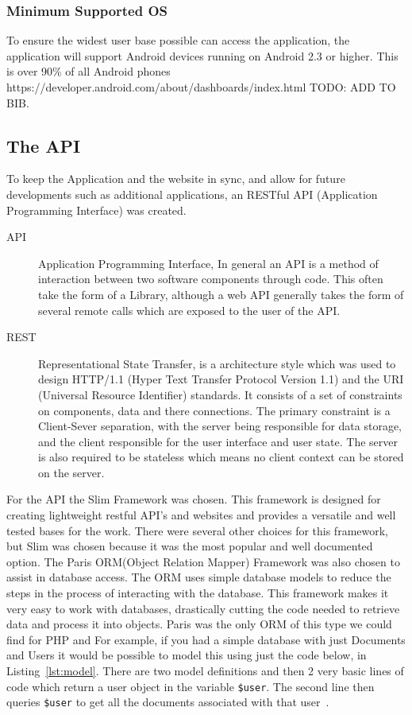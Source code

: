 \documentclass[11pt,a4paper]{article}
\begin{document}
\subsubsection{Minimum Supported OS}
To ensure the widest user base possible can access the application, the application will support Android devices running on Android 2.3 or higher. This is over 90\% of all Android phones https://developer.android.com/about/dashboards/index.html TODO: ADD TO BIB.

\subsection{The API}
\label{sec:techAPI}
To keep the Application and the website in sync, and allow for future developments such as additional applications, an RESTful API (Application Programming Interface) was created.

\begin{description}
\item[API] Application Programming Interface, In general an API is a method of interaction between two software components through code. This often take the form of a Library, although a web API generally takes the form of several remote calls which are exposed to the user of the API.

\item[REST] Representational State Transfer, is a architecture style which was used to design HTTP/1.1 (Hyper Text Transfer Protocol Version 1.1) and the URI (Universal Resource Identifier) standards. It consists of a set of constraints on components, data and there connections. The primary constraint is a Client-Sever separation, with the server being responsible for data storage, and the client responsible for the user interface and user state. The server is also required to be stateless which means no client context can be stored on the server.
\end{description}

For the API the Slim Framework\cite{slim} was chosen. This framework is designed for creating lightweight restful API's and websites and provides a versatile and well tested bases for the work. There were several other choices for this framework, but Slim was chosen because it was the most popular and well documented option. The Paris ORM(Object Relation Mapper) Framework\cite{paris} was also chosen to assist in database access. The ORM uses simple database models to reduce the steps in the process of interacting with the database. This framework makes it very easy to work with databases, drastically cutting the code needed to retrieve data and process it into objects. Paris was the only ORM of this type we could find for PHP and  For example, if you had a simple database with just Documents and Users it would be possible to model this using just the code below, in Listing~\ref{lst:model}. There are two model definitions and then 2 very basic lines of code which return a user object in the variable \lstinline{$user}. The second line then queries \lstinline{$user} to get all the documents associated with that user~\cite{TomMilestone2}.
\end{document}
